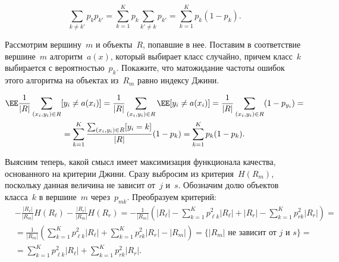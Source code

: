 \documentclass[12pt,fleqn]{article}
\begin{document}
\begin{esSolution}
    \[
        \sum_{k \neq k'} p_{k} p_{k'}
        =
        \sum_{k = 1}^{K} p_{k} \sum_{k' \neq k} p_{k'}
        =
        \sum_{k = 1}^{K} p_{k} (1 - p_{k}).
    \]
\end{esSolution}

\begin{vkProblem}
    Рассмотрим вершину~$m$ и объекты~$R$, попавшие в нее.
    Поставим в соответствие вершине~$m$ алгоритм~$a(x)$,
    который выбирает класс случайно, причем класс~$k$ выбирается
    с вероятностью~$p_{k}$.
    Покажите, что матожидание частоты ошибок этого алгоритма на объектах
    из~$R_m$ равно индексу Джини.
\end{vkProblem}

\begin{esSolution}
    \begin{multline*}
        \EE \frac{1}{|R|} \sum_{(x_i, y_i) \in R} [y_i \neq a(x_i)]
        =
        \frac{1}{|R|} \sum_{(x_i, y_i) \in R} \EE [y_i \neq a(x_i)]
        =
        \frac{1}{|R|} \sum_{(x_i, y_i) \in R} (1 - p_{y_i})
        =\\
        =
        \sum_{k = 1}^{K} \frac{\sum_{(x_i, y_i) \in R} [y_i = k]}{|R|} (1 - p_{k})
        =
        \sum_{k = 1}^{K} p_{k} (1 - p_{k}).
    \end{multline*}
\end{esSolution}

Выясним теперь, какой смысл имеет максимизация функционала качества, основанного на критерии Джини.
Сразу выбросим из критерия~$H(R_m)$, поскольку данная величина не зависит от~$j$ и~$s$.
Обозначим долю объектов класса~$k$ в вершине~$m$ через~$p_{mk}$.
Преобразуем критерий:
\begin{align*}
    &- \frac{|R_\ell|}{|R_m|} H(R_\ell) - \frac{|R_r|}{|R_m|} H(R_r)
    =
    - \frac{1}{|R_m|} \left(
        |R_\ell| - \sum_{k = 1}^{K} p_{\ell k}^2 |R_\ell| +
        |R_r| - \sum_{k = 1}^{K} p_{r k}^2 |R_r|
    \right)
    =\\
    &=
    \frac{1}{|R_m|} \left(
        \sum_{k = 1}^{K} p_{\ell k}^2 |R_\ell| +
        \sum_{k = 1}^{K} p_{r k}^2 |R_r|
        - |R_m|
    \right)
    =
    \{\text{$|R_m|$ не зависит от~$j$ и~$s$}\}
    =\\
    &=
    \sum_{k = 1}^{K} p_{\ell k}^2 |R_\ell| +
    \sum_{k = 1}^{K} p_{r k}^2 |R_r|.
\end{align*}
\end{document}
